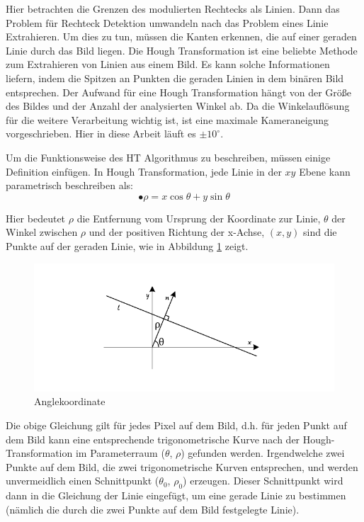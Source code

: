 Hier betrachten die Grenzen des modulierten Rechtecks als Linien. Dann das Problem für Rechteck Detektion umwandeln nach das Problem eines Linie Extrahieren. Um dies zu tun, müssen die Kanten erkennen, die auf einer geraden Linie durch das Bild liegen. Die Hough Transformation ist eine beliebte Methode zum Extrahieren von Linien aus einem Bild. Es kann solche Informationen liefern, indem die Spitzen an Punkten die geraden Linien in dem binären Bild entsprechen. Der Aufwand für eine Hough Transformation hängt von der Größe des Bildes und der Anzahl der analysierten Winkel ab. Da die Winkelauflösung für die weitere Verarbeitung wichtig ist, ist eine maximale Kameraneigung vorgeschrieben. Hier in diese Arbeit läuft es $ \pm 10^{\circ} $.


Um die Funktionsweise des HT Algorithmus zu beschreiben, müssen einige Definition einfügen. In Hough Transformation, jede Linie in der $ xy $ Ebene kann parametrisch beschreiben als:
\begin{equation}
•  \rho = x \cos \theta + y \sin \theta
\end{equation} 

Hier bedeutet $ \rho $ die Entfernung vom Ursprung der Koordinate zur Linie, $ \theta $ der Winkel zwischen $ \rho $ und der positiven Richtung der x-Achse, $ (x,y) $ sind die Punkte auf der geraden Linie, wie in Abbildung \ref{fig:Hough} zeigt.

\begin{figure}[H]
 \centering 
  \includegraphics[keepaspectratio,width=1.0\textwidth]{images/4_ZweiteErfahrung/Hough/Hough.pdf}
 \caption{Anglekoordinate}
 \label{fig:Hough}
\end{figure}

Die obige Gleichung gilt für jedes Pixel auf dem Bild, d.h. für jeden Punkt auf dem Bild kann eine entsprechende trigonometrische Kurve nach der Hough-Transformation im Parameterraum ($ \theta $, $ \rho $) gefunden werden. Irgendwelche zwei Punkte auf dem Bild, die zwei  trigonometrische Kurven entsprechen, und werden unvermeidlich einen Schnittpunkt ($ \theta_0 $, $ \rho_0 $) erzeugen. Dieser Schnittpunkt wird dann in die Gleichung der Linie eingefügt, um eine gerade Linie zu bestimmen (nämlich die durch die zwei Punkte auf dem Bild festgelegte Linie). 

